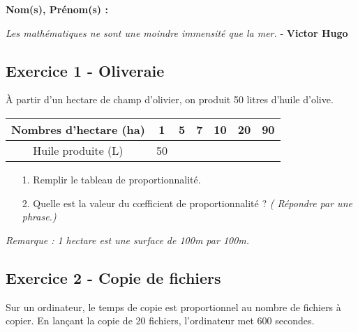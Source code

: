 \documentclass[12pt]{article}
\begin{document}

\textbf{Nom(s), Prénom(s) :}

\begin{center}
\textit{Les mathématiques ne sont une moindre immensité que la mer.} - \textbf{Victor Hugo}
\end{center}

\subsection*{Exercice 1 - Oliveraie}

À partir d'un hectare de champ d'olivier, on produit 50 litres d'huile d'olive. 

\begin{center}
  \begin{tabular}{| c ||           c | c | c |  c |  c |  c|}
    \hline
    Nombres d'hectare (ha)      &  1 & 5 & 7 & 10 & 20 & 90 \\
    \hline
    Huile produite (L) & 50 & \phantom{$\frac{aze}{aazertyui}$} & \phantom{$\frac{aze}{aazertyui}$} & \phantom{$\frac{aze}{aazertyui}$} &  \phantom{$\frac{aze}{aazertyui}$} & \phantom{$\frac{aze}{aazertyui}$} \\ 
    \hline
  \end{tabular}
\end{center}


\begin{enumerate}
\item[1.] Remplir le tableau de proportionnalité. 
\item[2.] Quelle est la valeur du cœfficient de proportionnalité ? \textit{( Répondre par une phrase.)}
\vspace{1cm}
\end{enumerate}

\textit{Remarque : 1 hectare est une surface de 100m par 100m.}

\subsection*{Exercice 2 - Copie de fichiers}

Sur un ordinateur, le temps de copie est proportionnel au nombre de fichiers à copier. En lançant la copie de 20 fichiers, l'ordinateur met 600 secondes. 
\end{document}
